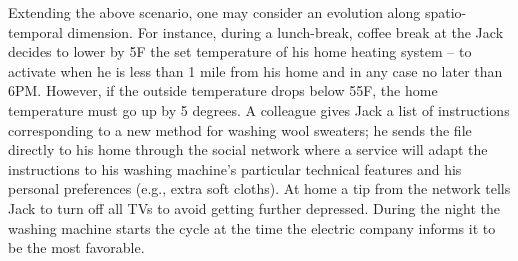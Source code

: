
 Extending the above scenario, one may consider an evolution along spatio-temporal dimension. For instance, during a lunch-break, coffee break at the Jack decides to lower by 5F the set temperature of his home heating system – to activate when he is less than 1 mile from his home and in any case no later than 6PM. However, if the outside temperature drops below 55F, the home temperature must go up by 5 degrees. A colleague gives Jack a list of instructions corresponding to a new method for washing wool sweaters; he  sends the file directly to his home through the social network where a service will adapt the instructions to his washing machine’s particular technical features and his personal preferences (e.g., extra soft cloths). %
  At home a tip from the network tells Jack to turn off all TVs to avoid getting further depressed. During the night the washing machine starts the cycle at the time the electric company informs it to be the most favorable.

